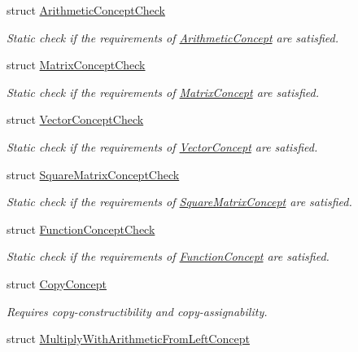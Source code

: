 \begin{DoxyCompactItemize}
struct \hyperlink{structfuncy_1_1Concepts_1_1ArithmeticConceptCheck}{Arithmetic\-Concept\-Check}
\begin{DoxyCompactList}\small\item\em Static check if the requirements of \hyperlink{structfuncy_1_1Concepts_1_1ArithmeticConcept}{Arithmetic\-Concept} are satisfied. \end{DoxyCompactList}\item 
struct \hyperlink{structfuncy_1_1Concepts_1_1MatrixConceptCheck}{Matrix\-Concept\-Check}
\begin{DoxyCompactList}\small\item\em Static check if the requirements of \hyperlink{structfuncy_1_1Concepts_1_1MatrixConcept}{Matrix\-Concept} are satisfied. \end{DoxyCompactList}\item 
struct \hyperlink{structfuncy_1_1Concepts_1_1VectorConceptCheck}{Vector\-Concept\-Check}
\begin{DoxyCompactList}\small\item\em Static check if the requirements of \hyperlink{structfuncy_1_1Concepts_1_1VectorConcept}{Vector\-Concept} are satisfied. \end{DoxyCompactList}\item 
struct \hyperlink{structfuncy_1_1Concepts_1_1SquareMatrixConceptCheck}{Square\-Matrix\-Concept\-Check}
\begin{DoxyCompactList}\small\item\em Static check if the requirements of \hyperlink{structfuncy_1_1Concepts_1_1SquareMatrixConcept}{Square\-Matrix\-Concept} are satisfied. \end{DoxyCompactList}\item 
struct \hyperlink{structfuncy_1_1Concepts_1_1FunctionConceptCheck}{Function\-Concept\-Check}
\begin{DoxyCompactList}\small\item\em Static check if the requirements of \hyperlink{structfuncy_1_1Concepts_1_1FunctionConcept}{Function\-Concept} are satisfied. \end{DoxyCompactList}\item 
struct \hyperlink{structfuncy_1_1Concepts_1_1CopyConcept}{Copy\-Concept}
\begin{DoxyCompactList}\small\item\em Requires copy-\/constructibility and copy-\/assignability. \end{DoxyCompactList}\item 
struct \hyperlink{structfuncy_1_1Concepts_1_1MultiplyWithArithmeticFromLeftConcept}{Multiply\-With\-Arithmetic\-From\-Left\-Concept}

\end{DoxyCompactItemize}
